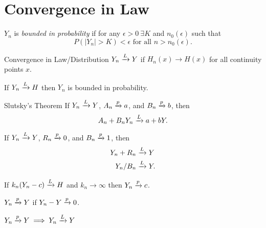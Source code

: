 \section{Convergence in Law}%
\label{sec:convergence_in_law}

\begin{definition}
    $Y_n$ is \textit{bounded in probability} if for any $\epsilon>0\ \exists K$
    and $n_0(\epsilon)$ such that
    \begin{equation*}
        P(|Y_n| > K) < \epsilon \text{ for all } n > n_0(\epsilon).
    \end{equation*}
\end{definition}

\begin{definition}{Convergence in Law/Distribution}
    $Y_n \xrightarrow{L} Y$ if $H_n(x) \to H(x)$ for all continuity points $x$.
\end{definition}

\begin{thm}
    If $Y_n \xrightarrow{L} H$ then $Y_n$ is bounded in probability.
\end{thm}

\begin{thm}{Slutsky's Theorem}
    If $Y_n \xrightarrow{L} Y$, $A_n \xrightarrow{p} a$, and $B_n \xrightarrow{p} b$, then
    \begin{equation*}
        A_n + B_n Y_n \xrightarrow{L} a + b Y.
    \end{equation*}
\end{thm}

\begin{corollary}
    If $Y_n \xrightarrow{L} Y$, $R_n \xrightarrow{p} 0$, and $B_n \xrightarrow{p} 1$, then
    \begin{align*}
        Y_n + R_n &\xrightarrow{L} Y \\
        Y_n / B_n &\xrightarrow{L} Y.
    \end{align*}
\end{corollary}

\begin{thm}
    If $k_n (Y_n - c) \xrightarrow{L} H$ and $k_n \to \infty$ then $Y_n \xrightarrow{p} c$.
\end{thm}

\begin{definition}
    $Y_n \xrightarrow{p} Y$ if $Y_n - Y \xrightarrow{p} 0$.
\end{definition}

\begin{thm}
    $Y_n \xrightarrow{p} Y \implies Y_n \xrightarrow{L} Y$ 
\end{thm}
